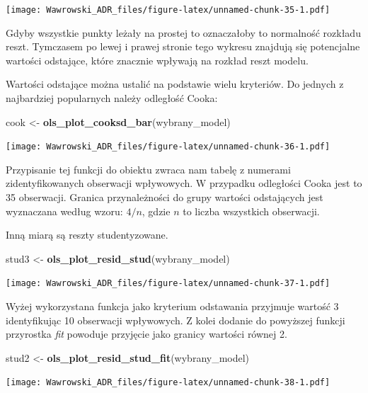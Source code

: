 \documentclass[
]{book}
\newenvironment{Shaded}{\begin{snugshade}}{\end{snugshade}}
\newcommand{\KeywordTok}[1]{\textcolor[rgb]{0.13,0.29,0.53}{\textbf{#1}}}
\newcommand{\NormalTok}[1]{#1}
\newcommand{\StringTok}[1]{\textcolor[rgb]{0.31,0.60,0.02}{#1}}
\begin{document}
\texttt{[image: Wawrowski\_ADR\_files/figure-latex/unnamed-chunk-35-1.pdf]}

Gdyby wszystkie punkty leżały na prostej to oznaczałoby to normalność rozkładu reszt. Tymczasem po lewej i prawej stronie tego wykresu znajdują się potencjalne wartości odstające, które znacznie wpływają na rozkład reszt modelu.

Wartości odstające można ustalić na podstawie wielu kryteriów. Do jednych z najbardziej popularnych należy odległość Cooka:

\begin{Shaded}
\begin{Highlighting}[]
\NormalTok{cook <-}\StringTok{ }\KeywordTok{ols_plot_cooksd_bar}\NormalTok{(wybrany_model)}
\end{Highlighting}
\end{Shaded}

\texttt{[image: Wawrowski\_ADR\_files/figure-latex/unnamed-chunk-36-1.pdf]}

Przypisanie tej funkcji do obiektu zwraca nam tabelę z numerami zidentyfikowanych obserwacji wpływowych. W przypadku odległości Cooka jest to 35 obserwacji. Granica przynależności do grupy wartości odstających jest wyznaczana według wzoru: \(4/n\), gdzie \(n\) to liczba wszystkich obserwacji.

Inną miarą są reszty studentyzowane.

\begin{Shaded}
\begin{Highlighting}[]
\NormalTok{stud3 <-}\StringTok{ }\KeywordTok{ols_plot_resid_stud}\NormalTok{(wybrany_model)}
\end{Highlighting}
\end{Shaded}

\texttt{[image: Wawrowski\_ADR\_files/figure-latex/unnamed-chunk-37-1.pdf]}

Wyżej wykorzystana funkcja jako kryterium odstawania przyjmuje wartość 3 identyfikując 10 obserwacji wpływowych. Z kolei dodanie do powyższej funkcji przyrostka \emph{fit} powoduje przyjęcie jako granicy wartości równej 2.

\begin{Shaded}
\begin{Highlighting}[]
\NormalTok{stud2 <-}\StringTok{ }\KeywordTok{ols_plot_resid_stud_fit}\NormalTok{(wybrany_model)}
\end{Highlighting}
\end{Shaded}

\texttt{[image: Wawrowski\_ADR\_files/figure-latex/unnamed-chunk-38-1.pdf]}
\end{document}
